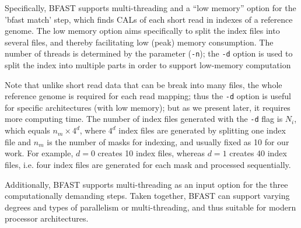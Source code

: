 \documentclass{cpeauth}
\begin{document}
Specifically, BFAST supports multi-threading and a ``low memory''
option for the 'bfast match' step, which finds CALs of each short read in
indexes of a reference genome.  The low memory option aims specifically to
split the index files into several files, and thereby facilitating low
(peak) memory consumption.  The number of threads is determined by the
parameter (\texttt{-n}); the \texttt{-d} option is used to split the
index into multiple parts in order to support low-memory computation


Note that unlike short read data that can be break into many files, the whole reference genome is required for each read mapping;
thus the \texttt{-d} option is useful for specific architectures (with
low memory); but as we present later, it requires more computing time.  The number of index files
generated with the \texttt{-d} flag is $N_i$, which equals $n_m \times
4^d$, where $4^d$ index files are generated by splitting one index file and
$n_m$ is the number of masks for indexing, and usually fixed as 10 for
our work.  For example, $d=0$ creates 10 index files, whereas $d=1$
creates 40 index files, i.e. four index files are generated for each mask
and processed sequentially.  

Additionally, BFAST supports multi-threading as an input option for
the three computationally demanding steps.  Taken together, BFAST can
support varying degrees and types of parallelism or multi-threading,
and thus suitable for modern processor architectures.
\end{document}

